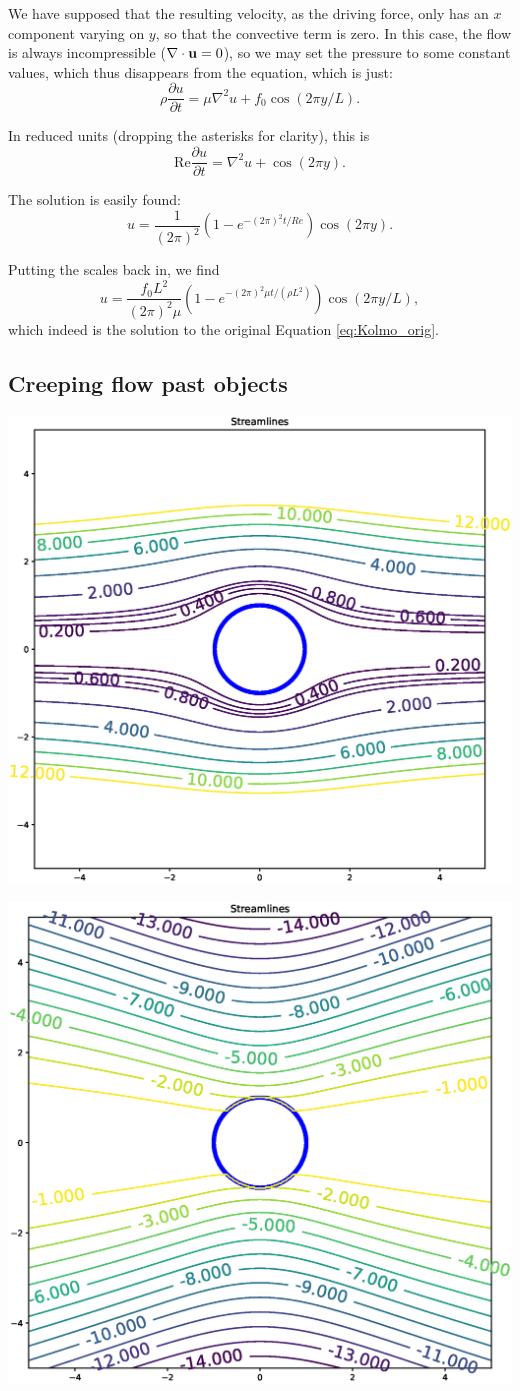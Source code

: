 We have supposed that the resulting velocity, as the driving force,
only has an $x$ component varying on $y$, so that the convective term
is zero. In this case, the flow is always incompressible
($\nabla\cdot\mathbf{u} =0$), so we may set the pressure to some constant
values, which thus disappears from the equation, which is just:
\[
  \rho \frac{\partial u}{\partial t} =
  \mu \nabla^2 u +   f_0 \cos(2\pi y/L)  .
\]

In reduced units (dropping the asterisks for clarity), this is
\[
  \mathrm{Re} \frac{\partial u}{\partial t} = \nabla^2 u + \cos(2\pi y) .
\]

The solution is easily found:
\[
u = \frac{1}{(2\pi)^2} \left( 1-e^{ - (2\pi)^2 t/Re } \right)  \cos(2\pi y) .
\]

Putting the scales back in, we find
\[
u = \frac{ f_0 L^2 }{(2\pi)^2 \mu}
\left( 1-e^{- (2\pi)^2 \mu  t / (\rho L^2) } \right)  \cos(2\pi y/L) ,
\]
which indeed is the solution to the original Equation
\ref{eq:Kolmo_orig}.



\subsection{Creeping flow past objects}



\includegraphics[width=0.8\linewidth]{figures/creeping_flow_past_sphere}

\includegraphics[width=0.8\linewidth]{figures/creeping_flow_past_sphere_moving}
